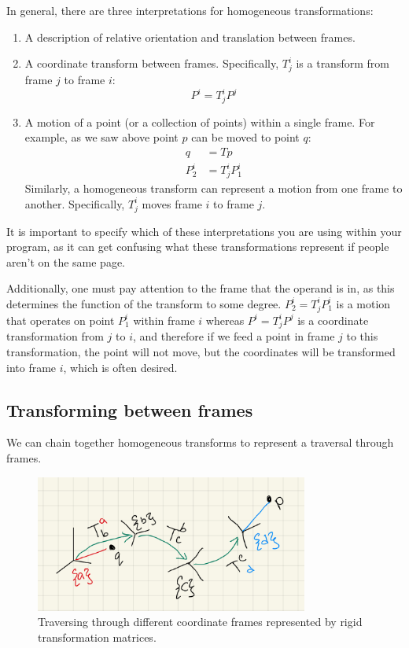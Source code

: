 In general, there are three interpretations for homogeneous transformations:
\begin{enumerate}
	\item A description of relative orientation and translation between frames. 
	\item A coordinate transform between frames. 
	Specifically, $T_j^i$ is a transform from frame ${j}$ to frame ${i}$:
	\begin{equation}
		P^i = T_j^i P^j
	\end{equation}
	\item A motion of a point (or a collection of points) within a single frame. For example, as we saw above point $p$ can be moved to point $q$:
	\begin{align}
		q &= Tp \\
		P_2^i &= T_j^i P^i_1
	\end{align}
	Similarly, a homogeneous transform can represent a motion from one frame to another.
	Specifically, $T_j^i$ moves frame $i$ to frame $j$. 
\end{enumerate}
It is important to specify which of these interpretations you are using within your program, as it can get confusing what these transformations represent if people aren't on the same page. 

Additionally, one must pay attention to the frame that the operand is in, as this determines the function of the transform to some degree. 
$P_2^i = T^i_j P_1^i$ is a motion that operates on point $P_1^i$ within frame $i$ whereas $P^i = T_j^i P^j$ is a coordinate transformation from $j$ to $i$, and therefore if we feed a point in frame $j$ to this transformation, the point will not move, but the coordinates will be transformed into frame $i$, which is often desired.  

\subsection{Transforming between frames}
We can chain together homogeneous transforms to represent a traversal through frames. 
\begin{figure}[H]
	\centering
	\includegraphics[width=0.8\textwidth]{images/frame_traversal.png}
	\caption{Traversing through different coordinate frames represented by rigid transformation matrices.}
	\label{fig: frames}
\end{figure}

